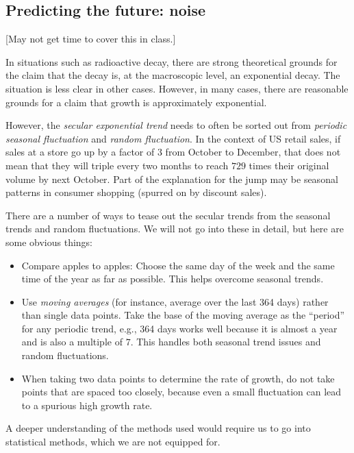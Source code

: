 \documentclass{amsart}
\begin{document}
\subsection{Predicting the future: noise}

[May not get time to cover this in class.]

In situations such as radioactive decay, there are strong theoretical
grounds for the claim that the decay is, at the macroscopic level, an
exponential decay. The situation is less clear in other
cases. However, in many cases, there are reasonable grounds for a
claim that growth is approximately exponential.

However, the {\em secular exponential trend} needs to often be sorted
out from {\em periodic seasonal fluctuation} and {\em random
fluctuation}. In the context of US retail sales, if sales at a store
go up by a factor of $3$ from October to December, that does not mean
that they will triple every two months to reach $729$ times their
original volume by next October. Part of the explanation for the jump
may be seasonal patterns in consumer shopping (spurred on by discount
sales).

There are a number of ways to tease out the secular trends from the
seasonal trends and random fluctuations. We will not go into these in
detail, but here are some obvious things:

\begin{itemize}
\item Compare apples to apples: Choose the same day of the week and
  the same time of the year as far as possible. This helps overcome
  seasonal trends.
\item Use {\em moving averages} (for instance, average over the last
  364 days) rather than single data points. Take the base of the
  moving average as the ``period'' for any periodic trend, e.g., 364
  days works well because it is almost a year and is also a multiple
  of $7$. This handles both seasonal trend issues and random
  fluctuations.
\item When taking two data points to determine the rate of growth, do
  not take points that are spaced too closely, because even a small
  fluctuation can lead to a spurious high growth rate.
\end{itemize}

A deeper understanding of the methods used would require us to go into
statistical methods, which we are not equipped for.
\end{document}
